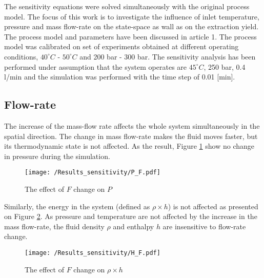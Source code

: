 \documentclass[../Article_Model_Parameters.tex]{subfiles}
\begin{document}
	
	\label{CH: Results}
	
	The sensitivity equations were solved simultaneously with the original process model. The focus of this work is to investigate the influence of inlet temperature, pressure and mass flow-rate on the state-space as wall as on the extraction yield. The process model and parameters have been discussed in {\color{red}article 1}. The process model was calibrated on set of experiments obtained at different operating conditions, $40^\circ C$ - $50^\circ C$ and 200 bar - 300 bar. The sensitivity analysis has been performed under assumption that the system operates are $45^\circ C$, 250 bar, 0.4 l/min and the simulation was performed with the time step of 0.01 [min].
	
	\subsection{Flow-rate}
	
	The increase of the mass-flow rate affects the whole system simultaneously in the spatial direction. The change in mass flow-rate makes the fluid moves faster, but its thermodynamic state is not affected.  As the result, Figure \ref{fig:Sensitivty_F_P} show no change in pressure during the simulation. 
    
    \begin{figure}[h!]
    	\centering
    	\texttt{[image: /Results\_sensitivity/P\_F.pdf]}
    	\caption{The effect of $F$ change on $P$}
    	\label{fig:Sensitivty_F_P}
    \end{figure}
    
    Similarly, the energy in the system (defined as $\rho \times h$) is not affected as presented on Figure \ref{fig:Sensitivty_F_H}. As pressure and temperature are not affected by the increase in the mass flow-rate, the fluid density $\rho$ and enthalpy $h$ are insensitive to flow-rate change. 
    
    \begin{figure}[h!]
    	\centering
    	\texttt{[image: /Results\_sensitivity/H\_F.pdf]}
    	\caption{The effect of $F$ change on $\rho \times h$}
    	\label{fig:Sensitivty_F_H}
    \end{figure}
    
\end{document}
